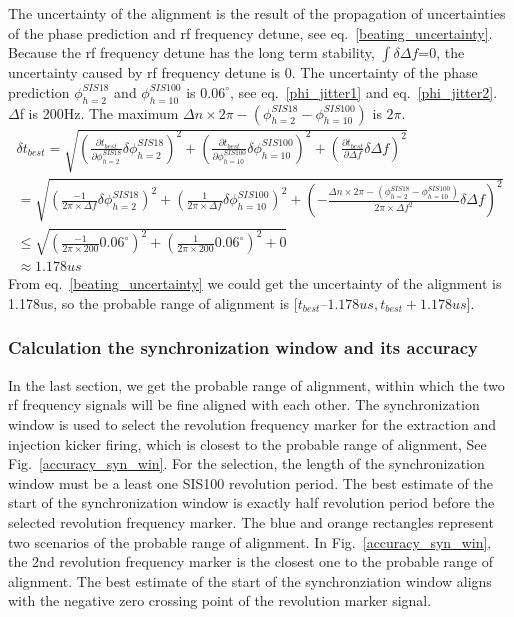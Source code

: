The uncertainty of the alignment is the result of the propagation of uncertainties of the phase prediction and rf frequency detune, see eq.~\ref{beating_uncertainty}. Because the rf frequency detune has the long term stability, $\int\delta \Delta f$=0, the uncertainty caused by rf frequency detune is 0. The uncertainty of the phase prediction $\phi_{h=2}^{SIS18}$ and $\phi_{h=10}^{SIS100}$ is $0.06^\circ$, see eq.~\ref{phi_jitter1} and eq.~\ref{phi_jitter2}. $\Delta$f is 200Hz. The maximum ${\Delta n} \times {2\pi} - (\phi_{h=2}^{SIS18}-\phi_{h=10}^{SIS100})$ is $2\pi$.
\begin{equation}
\begin{aligned}
\delta t_{best} =\sqrt {(\frac {\partial t_{best}}{\partial \phi_{h=2}^{SIS18}}\delta \phi_{h=2}^{SIS18})^2 + (\frac {\partial t_{best}}{\partial \phi_{h=10}^{SIS100}}\delta \phi_{h=10}^{SIS100})^2+(\frac {\partial t_{best}}{\partial \Delta f}\delta \Delta f)^2} \\
 =\sqrt {(\frac{-1}{{2\pi} \times {\Delta f}}\delta \phi_{h=2}^{SIS18})^2+(\frac{1}{{2\pi} \times {\Delta f}}\delta \phi_{h=10}^{SIS100})^2+(-\frac{{\Delta n} \times {2\pi} - (\phi_{h=2}^{SIS18}-\phi_{h=10}^{SIS100})}{{2\pi} \times {\Delta f}^2}\delta \Delta f)^2} \\
\le \sqrt {(\frac{-1}{{2\pi} \times {200}}0.06^\circ)^2+(\frac{1}{{2\pi} \times {200}}0.06^\circ)^2+0}\\
\approx 1.178us \label{beating_uncertainty}
\end{aligned}
\end{equation}
From eq.~\ref{beating_uncertainty} we could get the uncertainty of the alignment is 1.178us, so the probable range of alignment is [$t_{best} – 1.178us, t_{best}+ 1.178us$].
\subsubsection{Calculation the synchronization window and its accuracy}
In the last section, we get the probable range of alignment, within which the two rf frequency signals will be fine aligned with each other. The synchronization window is used to select the revolution frequency marker for the extraction and injection kicker firing, which is closest to the probable range of alignment, See Fig.~\ref{accuracy_syn_win}. For the selection, the length of the synchronization window must be a least one SIS100 revolution period. The best estimate of the start of the synchronization window is exactly half revolution period before the selected revolution frequency marker. The blue and orange rectangles represent two scenarios of the probable range of alignment. In Fig.~\ref{accuracy_syn_win}, the 2nd revolution frequency marker is the closest one to the probable range of alignment. The best estimate of the start of the synchronziation window aligns with the negative zero crossing point of the revolution marker signal.


